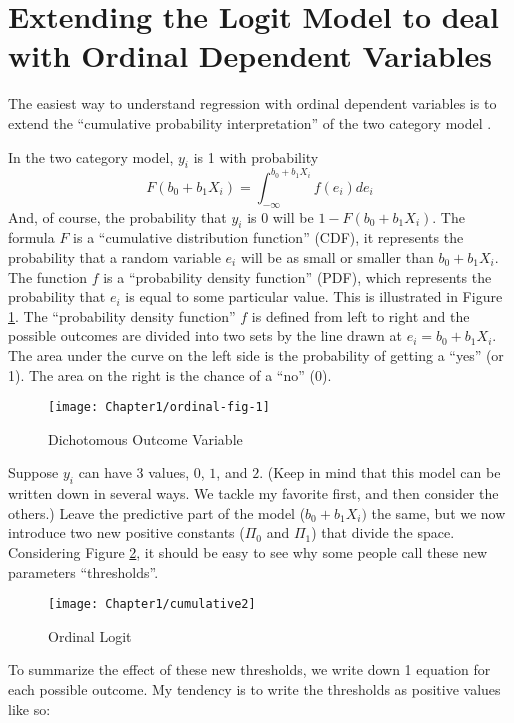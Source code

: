 \section{Extending the Logit Model to deal with Ordinal Dependent Variables}

The easiest way to understand regression with ordinal dependent variables
is to extend the ``cumulative probability interpretation'' of the
two category model \citep{pinheiro_mixed-effects_2000}. 

In the two category model, $y_{i}$ is 1 with probability 
\begin{equation}
F(b_{0}+b_{1}X_{i})=\int_{-\infty}^{b_{0}+b_{1}X_{i}}f(e_{i})de_{i}
\end{equation}
And, of course, the probability that $y_{i}$ is 0 will be $1-F(b_{0}+b_{1}X_{i}).$
The formula $F$ is a ``cumulative distribution function'' (CDF),
it represents the probability that a random variable $e_{i}$ will
be as small or smaller than $b_{0}+b_{1}X_{i}$. The function $f$
is a ``probability density function'' (PDF), which represents the
probability that $e_{i}$ is equal to some particular value. This
is illustrated in Figure \ref{fig:Dichotomous}. The ``probability
density function'' $f$ is defined from left to right and the possible
outcomes are divided into two sets by the line drawn at $e_{i}=b_{0}+b_{1}X_{i}$.
The area under the curve on the left side is the probability of getting
a ``yes'' (or 1). The area on the right is the chance of a ``no''
(0).

\begin{figure}
\begin{centering}
\texttt{[image: Chapter1/ordinal-fig-1]}
\par\end{centering}
\caption{Dichotomous Outcome Variable\label{fig:Dichotomous}}
\end{figure}
Suppose $y_{i}$ can have $3$ values, $0$, $1$, and $2$. (Keep
in mind that this model can be written down in several ways. We tackle
my favorite first, and then consider the others.) Leave the predictive
part of the model ($b_{0}+b_{1}X_{i})$ the same, but we now introduce
two new positive constants ($\Pi_{0}$ and $\Pi_{1}$) that divide
the space. Considering Figure \ref{cap:Ordinal-Logit}, it should
be easy to see why some people call these new parameters ``thresholds''. 

\begin{figure}
\begin{centering}
\texttt{[image: Chapter1/cumulative2]}
\par\end{centering}
\caption{Ordinal Logit\label{cap:Ordinal-Logit}}
\end{figure}
To summarize the effect of these new thresholds, we write down 1 equation
for each possible outcome. My tendency is to write the thresholds
as positive values like so:

